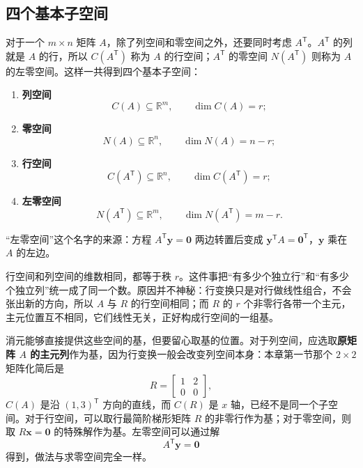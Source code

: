 \documentclass[UTF8,a4paper,12pt]{ctexart}
\numberwithin{equation}{section}
\newcommand{\R}{\mathbb{R}}
\newcommand{\trans}{^{\mathsf T}}
\begin{document}
	\subsection{四个基本子空间}
	
	对于一个 $m\times n$ 矩阵 $A$，除了列空间和零空间之外，还要同时考虑 $A\trans$。$A\trans$ 的列就是 $A$ 的行，所以 $C(A\trans)$ 称为 $A$ 的行空间；$A\trans$ 的零空间 $N(A\trans)$ 则称为 $A$ 的左零空间。这样一共得到四个基本子空间：
	\begin{enumerate}
		\item \textbf{列空间}
		\begin{equation}\label{eq:5.57}
		C(A)\subseteq\R^m,
		\qquad
		\dim C(A)=r;
		\end{equation}
		\item \textbf{零空间}
		\begin{equation}\label{eq:5.58}
		N(A)\subseteq\R^n,
		\qquad
		\dim N(A)=n-r;
		\end{equation}
		\item \textbf{行空间}
		\begin{equation}\label{eq:5.59}
		C(A\trans)\subseteq\R^n,
		\qquad
		\dim C(A\trans)=r;
		\end{equation}
		\item \textbf{左零空间}
		\begin{equation}\label{eq:5.60}
		N(A\trans)\subseteq\R^m,
		\qquad
		\dim N(A\trans)=m-r.
		\end{equation}
	\end{enumerate}
	
	“左零空间”这个名字的来源：方程 $A\trans\bm{y}=\bm{0}$ 两边转置后变成 $\bm{y}\trans A=\bm{0}\trans$，$\bm{y}$ 乘在 $A$ 的左边。
	
	行空间和列空间的维数相同，都等于秩 $r$。这件事把“有多少个独立行”和“有多少个独立列”统一成了同一个数。原因并不神秘：行变换只是对行做线性组合，不会张出新的方向，所以 $A$ 与 $R$ 的行空间相同；而 $R$ 的 $r$ 个非零行各带一个主元，主元位置互不相同，它们线性无关，正好构成行空间的一组基。
	
	消元能够直接提供这些空间的基，但要留心取基的位置。对于列空间，应选取\textbf{原矩阵 $A$ 的主元列}作为基，因为行变换一般会改变列空间本身：本章第一节那个 $2\times2$ 矩阵化简后是
	\begin{equation}\label{eq:5.61}
	R=\begin{bmatrix}1&2\\0&0\end{bmatrix},
	\end{equation}
	$C(A)$ 是沿 $(1,3)\trans$ 方向的直线，而 $C(R)$ 是 $x$ 轴，已经不是同一个子空间。对于行空间，可以取行最简阶梯形矩阵 $R$ 的非零行作为基；对于零空间，则取 $R\bm{x}=\bm{0}$ 的特殊解作为基。左零空间可以通过解
	\begin{equation}\label{eq:5.62}
	A\trans\bm{y}=\bm{0}
	\end{equation}
	得到，做法与求零空间完全一样。
	
\end{document}
